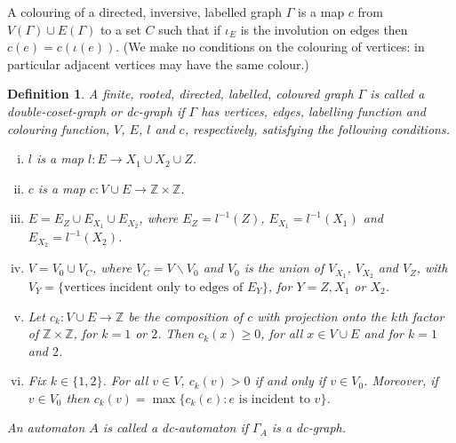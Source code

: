 \documentclass[a4paper,12pt]{article}
\newcommand{\G}{\Gamma }
\renewcommand{\i}{\iota }
\newtheorem{definition}[theorem]{Definition}
\numberwithin{equation}{section}
\numberwithin{figure}{section}
\newcommand{\ZZ}{\ensuremath{\mathbb{Z}}}
\newcommand{\maps}{\rightarrow}
\newcommand{\bs}{\backslash}
\newcommand{\be}{\begin{enumerate}}
\newcommand{\ee}{\end{enumerate}}
\begin{document}
A colouring of a directed, inversive, labelled graph $\G$ is a map $c$  from $V(\G)\cup E(\G)$
 to a set $C$ such that if $\i_E$ is the involution on edges 
then $c(e)=c(\i(e))$. (We make no conditions on the colouring of vertices:
in particular adjacent vertices may have the same colour.)

\begin{definition}
A finite, rooted, directed, labelled, coloured graph $\G$ is called a 
{\em double-coset-graph} or 
{\em dc-graph}
if $\G$ has vertices, edges, labelling function and colouring function,
 $V$, $E$, $l$ and $c$, 
respectively, satisfying the following conditions.
\be[(i)]
\item $l$ is a map $l:E\maps X_1\cup X_2\cup Z$.
\item $c$ is a map $c:V\cup E\maps \ZZ\times \ZZ$. 
\item $E=E_Z\cup E_{X_1}\cup E_{X_2}$,
where $E_Z=l^{-1}(Z)$, $E_{X_1}=l^{-1}(X_1)$ and $E_{X_2}=l^{-1}(X_2)$.
\item $V=V_0\cup V_C$, where $V_C=V\bs V_0$ and 
$V_0$ is the union of 
$V_{X_1}$, $V_{X_2}$ and $V_Z$, with   
$V_Y=\{\textrm{vertices incident only to edges of } E_Y\}$, for $Y=Z,X_1$ or $X_2$. 
\item Let $c_k:V\cup E\maps \ZZ$ be the composition of $c$ with projection
onto the $k$th factor of $\ZZ\times \ZZ$, for $k=1$ or $2$. Then 
$c_k(x)\ge 0$, for all $x\in V\cup E$ and  for $k=1$ and $2$. 
\item Fix $k\in \{1,2\}$.  For all $v\in V$,  
$c_k(v)>0$ if and only if $v\in V_0$. Moreover, if $v\in V_0$ then
$c_k(v)=\max\{c_k(e): e \textrm{ is incident to } v\}$. 
\ee
An automaton $A$ is called a {\em dc-automaton} if $\G_A$ is  a dc-graph.
\end{definition}
\end{document}
